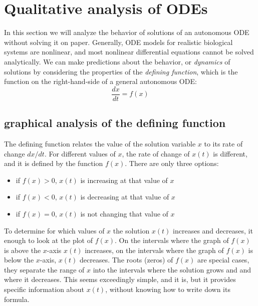 \documentclass[
]{book}
\theoremstyle{definition}
\theoremstyle{definition}
\theoremstyle{definition}
\theoremstyle{remark}
\begin{document}
\hypertarget{qualitative-analysis-of-odes}{%
\section{Qualitative analysis of ODEs}\label{qualitative-analysis-of-odes}}

\label{sec:math16}

In this section we will analyze the behavior of solutions of an autonomous ODE without solving it on paper. Generally, ODE models for realistic biological systems are nonlinear, and most nonlinear differential equations cannot be solved analytically. We can make predictions about the behavior, or \emph{dynamics} of solutions by considering the properties of the  \emph{defining function}, which is the function on the right-hand-side of a general autonomous ODE:
\[ \frac{dx}{dt} = f(x)\]

\hypertarget{graphical-analysis-of-the-defining-function}{%
\subsection{graphical analysis of the defining function}\label{graphical-analysis-of-the-defining-function}}

The defining function relates the value of the solution variable \(x\) to its rate of change \(dx/dt\). For different values of \(x\), the rate of change of \(x(t)\) is different, and it is defined by the function \(f(x)\). There are only three options:

\begin{itemize}
\item
  if \(f(x) > 0\), \(x(t)\) is increasing at that value of \(x\)
\item
  if \(f(x) < 0\), \(x(t)\) is decreasing at that value of \(x\)
\item
  if \(f(x) = 0\), \(x(t)\) is not changing that value of \(x\)
\end{itemize}

To determine for which values of \(x\) the solution \(x(t)\) increases and decreases, it enough to look at the plot of \(f(x)\). On the intervals where the graph of \(f(x)\) is above the \(x\)-axis \(x(t)\) increases, on the intervals where the graph of \(f(x)\) is below the \(x\)-axis, \(x(t)\) decreases. The roots (zeros) of \(f(x)\) are special cases, they separate the range of \(x\) into the intervals where the solution grows and and where it decreases. This seems exceedingly simple, and it is, but it provides specific information about \(x(t)\), without knowing how to write down its formula.
\end{document}
